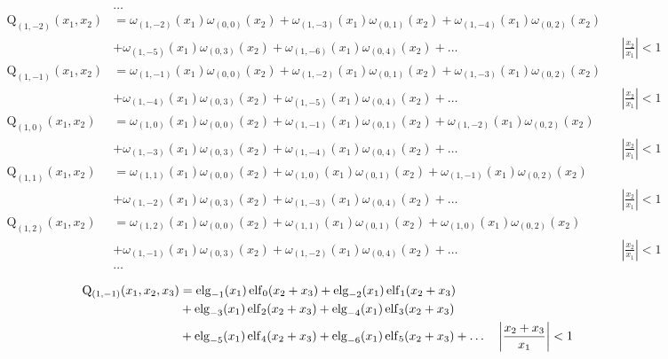 \begin{equation*} \begin{aligned}
&\ldots \\
%
\mathrm{Q}_{(1,-2)}(x_1, x_2) &=   
  \omega_{(1,-2)}(x_1) \omega_{(0,0)}(x_2)
+ \omega_{(1,-3)}(x_1) \omega_{(0,1)}(x_2)  
+ \omega_{(1,-4)}(x_1) \omega_{(0,2)}(x_2) \\ &
+ \omega_{(1,-5)}(x_1) \omega_{(0,3)}(x_2)
+ \omega_{(1,-6)}(x_1) \omega_{(0,4)}(x_2)
+ \ldots & 
&\left| \frac{x_2}{x_1} \right| < 1 \\
%
\mathrm{Q}_{(1,-1)}(x_1, x_2) &=   
  \omega_{(1,-1)}(x_1) \omega_{(0,0)}(x_2)
+ \omega_{(1,-2)}(x_1) \omega_{(0,1)}(x_2)  
+ \omega_{(1,-3)}(x_1) \omega_{(0,2)}(x_2) \\ &
+ \omega_{(1,-4)}(x_1) \omega_{(0,3)}(x_2)
+ \omega_{(1,-5)}(x_1) \omega_{(0,4)}(x_2)
+ \ldots & 
&\left| \frac{x_2}{x_1} \right| < 1 \\
%
\mathrm{Q}_{(1,0)}(x_1, x_2) &=   
  \omega_{(1,0)}(x_1) \omega_{(0,0)}(x_2)
+ \omega_{(1,-1)}(x_1) \omega_{(0,1)}(x_2)  
+ \omega_{(1,-2)}(x_1) \omega_{(0,2)}(x_2) \\ &
+ \omega_{(1,-3)}(x_1) \omega_{(0,3)}(x_2)
+ \omega_{(1,-4)}(x_1) \omega_{(0,4)}(x_2)
+ \ldots & 
&\left| \frac{x_2}{x_1} \right| < 1 \\
%
\mathrm{Q}_{(1,1)}(x_1, x_2) &=   
  \omega_{(1,1)}(x_1) \omega_{(0,0)}(x_2)
+ \omega_{(1,0)}(x_1) \omega_{(0,1)}(x_2)
+ \omega_{(1,-1)}(x_1) \omega_{(0,2)}(x_2) \\ &
+ \omega_{(1,-2)}(x_1) \omega_{(0,3)}(x_2)
+ \omega_{(1,-3)}(x_1) \omega_{(0,4)}(x_2)
+ \ldots & 
&\left| \frac{x_2}{x_1} \right| < 1 \\
%
\mathrm{Q}_{(1,2)}(x_1, x_2) &=   
  \omega_{(1,2)}(x_1) \omega_{(0,0)}(x_2)
+ \omega_{(1,1)}(x_1) \omega_{(0,1)}(x_2)
+ \omega_{(1,0)}(x_1) \omega_{(0,2)}(x_2) \\ &
+ \omega_{(1,-1)}(x_1) \omega_{(0,3)}(x_2)
+ \omega_{(1,-2)}(x_1) \omega_{(0,4)}(x_2)
+ \ldots & 
&\left| \frac{x_2}{x_1} \right| < 1 \\
%
&\ldots \\
\end{aligned} \end{equation*}
\begin{equation*} \begin{aligned}
\mathrm{Q}_{(1,-1)}(x_1, x_2, x_3) &=   
  \operatorname{elg}_{-1}(x_1) \operatorname{elf}_0(x_2 + x_3)
+ \operatorname{elg}_{-2}(x_1) \operatorname{elf}_1(x_2 + x_3)  \\ & 
+ \operatorname{elg}_{-3}(x_1) \operatorname{elf}_2(x_2 + x_3)
+ \operatorname{elg}_{-4}(x_1) \operatorname{elf}_3(x_2 + x_3) \\ &
+ \operatorname{elg}_{-5}(x_1) \operatorname{elf}_4(x_2 + x_3)
+ \operatorname{elg}_{-6}(x_1) \operatorname{elf}_5(x_2 + x_3)
+ \ldots & 
&\left| \frac{x_2 + x_3}{x_1} \right| < 1 \\
\end{aligned} \end{equation*}
